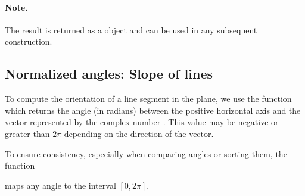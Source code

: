\paragraph{Note.}
The result is returned as a  object and can be used in any subsequent construction.

\subsection{Normalized angles: Slope of lines}
\label{sub:normalized_angles}

To compute the orientation of a line segment in the plane, we use the function  which returns the angle (in radians) between the positive horizontal axis and the vector represented by the complex number . This value may be negative or greater than $2\pi$ depending on the direction of the vector.

\medskip
To ensure consistency, especially when comparing angles or sorting them, the function

 maps any angle to the interval $[0, 2\pi]$.

